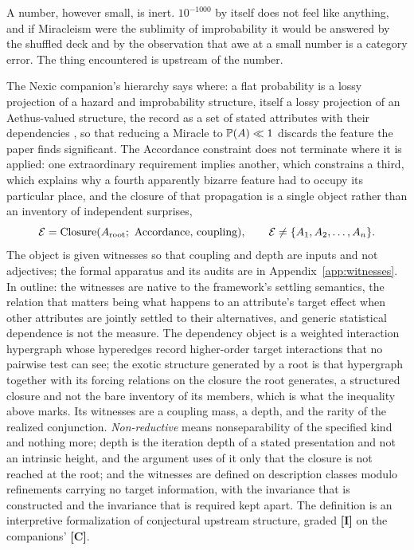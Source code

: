 A number, however small, is inert. $10^{-1000}$ by itself does not feel like
anything, and if Miracleism were the sublimity of improbability it would be
answered by the shuffled deck and by the observation that awe at a small
number is a category error. The thing encountered is upstream of the number.

The Nexic companion's hierarchy says where: a flat probability is a lossy
projection of a hazard and improbability structure, itself a lossy projection
of an Aethus-valued structure, the record as a set of stated attributes with
their dependencies \cite{Nexus,Aethus}, so that reducing a Miracle to
$\mathbb{P}(A)\ll1$ discards the feature the paper finds significant. The Accordance
constraint does not terminate where it is applied: one extraordinary
requirement implies another, which constrains a third, which explains why a
fourth apparently bizarre feature had to occupy its particular place, and the
closure of that propagation is a single object rather than an inventory of
independent surprises,
\[
\Ec=\operatorname{Closure}(A_{\mathrm{root}};\ \text{Accordance, coupling}),
\qquad
\Ec\neq\{A_1,A_2,\dots,A_n\}.
\]
The object is given witnesses so that coupling and depth are inputs and not
adjectives; the formal apparatus and its audits are in
Appendix~\ref{app:witnesses}. In outline: the witnesses are native to the
framework's settling semantics, the relation that matters being what happens
to an attribute's target effect when other attributes are jointly settled to
their alternatives, and generic statistical dependence is not the measure.
The dependency object is a weighted interaction hypergraph whose hyperedges
record higher-order target interactions that no pairwise test can see; the
exotic structure generated by a root is that hypergraph together with its
forcing relations on the closure the root generates, a structured closure
and not the bare inventory of its members, which is what the inequality
above marks. Its witnesses are a coupling mass, a depth, and the rarity of
the realized conjunction. \emph{Non-reductive} means nonseparability of the
specified kind and nothing more; depth is the iteration depth of a stated
presentation and not an intrinsic height, and the argument uses of it only
that the closure is not reached at the root; and the witnesses are defined
on description classes modulo refinements carrying no target information,
with the invariance that is constructed and the invariance that is required
kept apart. The definition is an interpretive formalization of conjectural
upstream structure, graded \textbf{[I]} on the companions' \textbf{[C]}.


